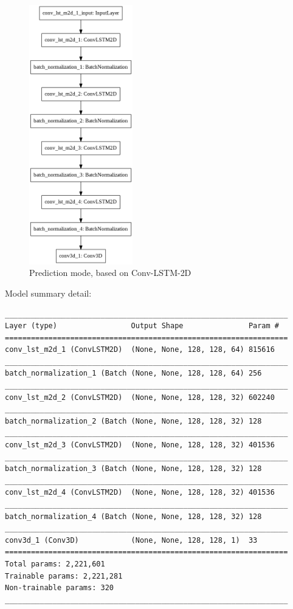 \begin{figure}[h!]
	\centering
	\includegraphics[width=0.4\textwidth]{figures/time_model.png}
	\caption{Prediction mode, based on Conv-LSTM-2D}
	\label{fig:timeModel}
\end{figure}

Model summary detail:

\begin{verbatim}
_________________________________________________________________
Layer (type)                 Output Shape               Param #   
=================================================================
conv_lst_m2d_1 (ConvLSTM2D)  (None, None, 128, 128, 64) 815616    
_________________________________________________________________
batch_normalization_1 (Batch (None, None, 128, 128, 64) 256       
_________________________________________________________________
conv_lst_m2d_2 (ConvLSTM2D)  (None, None, 128, 128, 32) 602240    
_________________________________________________________________
batch_normalization_2 (Batch (None, None, 128, 128, 32) 128       
_________________________________________________________________
conv_lst_m2d_3 (ConvLSTM2D)  (None, None, 128, 128, 32) 401536    
_________________________________________________________________
batch_normalization_3 (Batch (None, None, 128, 128, 32) 128       
_________________________________________________________________
conv_lst_m2d_4 (ConvLSTM2D)  (None, None, 128, 128, 32) 401536    
_________________________________________________________________
batch_normalization_4 (Batch (None, None, 128, 128, 32) 128       
_________________________________________________________________
conv3d_1 (Conv3D)            (None, None, 128, 128, 1)  33        
=================================================================
Total params: 2,221,601
Trainable params: 2,221,281
Non-trainable params: 320
_________________________________________________________________
\end{verbatim}

